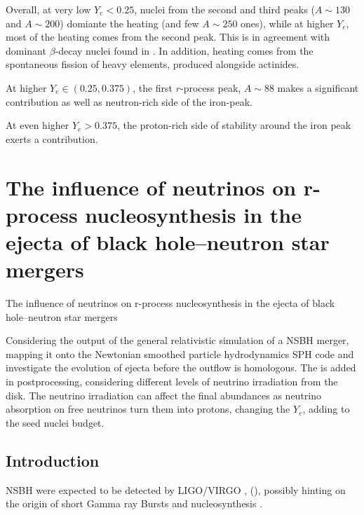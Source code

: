 Overall, at very low $Y_e < 0.25$, nuclei from the second and third peaks ($A\sim 130$ and $A\sim 200$) domiante the heating (and few $A\sim 250$ ones), while at higher $Y_e$, most of the heating comes from the second peak. This is in agreement with dominant $\beta$-decay nuclei found in \citep{Metzger:2010}. In addition, heating comes from the spontaneous fission of heavy elements, produced alongside actinides.

At higher $Y_e\in(0.25,0.375)$, the first $r$-process peak, $A\sim 88$ makes a significant contribution as well as neutron-rich side of the iron-peak. 

At even higher $Y_e>0.375$, the proton-rich side of stability around the iron peak exerts a contribution.




\section{The influence of neutrinos on r-process nucleosynthesis in the ejecta of black hole–neutron star mergers}




The influence of neutrinos on r-process nucleosynthesis
in the ejecta of black hole–neutron star mergers

Considering the output of the general relativistic simulation of a \ac{NSBH} merger, mapping it onto the Newtonian smoothed particle hydrodynamics \ac{SPH} code and investigate the evolution of ejecta before the outflow is homologous. The \nuc{} is added in postprocessing, considering different levels of neutrino irradiation from the disk. The neutrino irradiation can affect the final abundances as neutrino absorption on free neutrinos turn them into protons, changing the $Y_e$, adding to the seed nuclei budget.


\subsection{Introduction}

NSBH were expected to be detected by LIGO/VIRGO \citep{TheLIGOScientific:2014jea,TheVirgo:2014hva}, (), possibly hinting on the origin of short Gamma ray Bursts \cite[\eg][]{Lee:2007js} and \rproc{} nucleosynthesis \citep[\eg][]{Lattimer:1976,Korobkin:2012uy,Bauswein:2014qla}.

